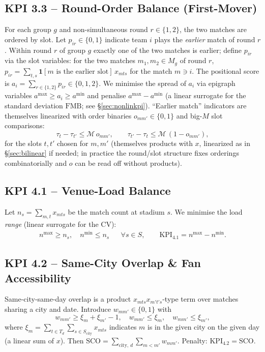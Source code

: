 \documentclass[12pt, letterpaper]{article}
\begin{document}
\subsection{KPI 3.3 -- Round-Order Balance (First-Mover)}
For each group $g$ and non-simultaneous round $r\in\{1,2\}$, the two
matches are ordered by slot. Let $p_{ir}\in\{0,1\}$ indicate team $i$
plays the \emph{earlier} match of round $r$. Within round $r$ of group
$g$ exactly one of the two matches is earlier; define $p_{ir}$ via the
slot variables: for the two matches $m_1,m_2\in M_g$ of round $r$,
$p_{ir}=\sum_{t,s}\mathbf 1[\text{$m$ is the earlier slot}]\,x_{mts}$ for
the match $m\ni i$. The positional score is $a_i=\sum_{r\in\{1,2\}}
p_{ir}\in\{0,1,2\}$. We minimise the spread of $a_i$ via epigraph
variables $a^{\max}\ge a_i\ge a^{\min}$ and penalise $a^{\max}-a^{\min}$
(a linear surrogate for the standard deviation $\mathrm{FMB}$; see
\S\ref{sec:nonlinkpi}). ``Earlier match'' indicators are themselves
linearized with order binaries $o_{m m'}\in\{0,1\}$ and big-$M$ slot
comparisons:
\begin{equation}
\tau_{t}-\tau_{t'} \le \mathcal M\,o_{mm'},\qquad
\tau_{t'}-\tau_{t} \le \mathcal M\,(1-o_{mm'}),
\end{equation}
for the slots $t,t'$ chosen for $m,m'$ (themselves products with $x$,
linearized as in \S\ref{sec:bilinear} if needed; in practice the
round/slot structure fixes orderings combinatorially and $o$ can be read
off without products).

\subsection{KPI 4.1 -- Venue-Load Balance}
Let $n_s=\sum_{m,t} x_{mts}$ be the match count at stadium $s$. We
minimise the load \emph{range} (linear surrogate for the CV):
\begin{align}
n^{\max}\ge n_s,\quad n^{\min}\le n_s &&\forall s\in S,\qquad
\mathrm{KPI}_{4.1}=n^{\max}-n^{\min}.
\end{align}

\subsection{KPI 4.2 -- Same-City Overlap \& Fan Accessibility}
Same-city-same-day overlap is a product $x_{mts}x_{m't's}$-type term over
matches sharing a city and date. Introduce $w_{mm'}\in\{0,1\}$ with
\begin{equation}
w_{mm'}\ge \xi_{m}+\xi_{m'}-1,\quad w_{mm'}\le \xi_m,\quad w_{mm'}\le
\xi_{m'},
\end{equation}
where $\xi_m=\sum_{t\in T_d}\sum_{s\in S_{\text{city}}} x_{mts}$ indicates
$m$ is in the given city on the given day (a linear sum of $x$). Then
$\mathrm{SCO}=\sum_{\text{city},\,d}\sum_{m<m'} w_{mm'}$. Penalty:
$\mathrm{KPI}_{4.2}=\mathrm{SCO}$.
\end{document}
